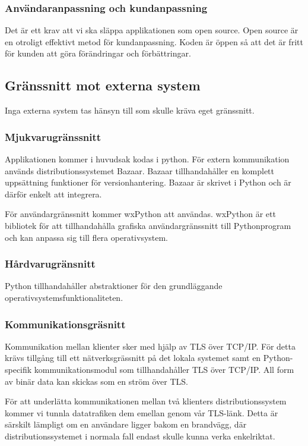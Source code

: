 \subsubsection{Användaranpassning och kundanpassning}
Det är ett krav att vi ska släppa applikationen som open source. Open source är en otroligt effektivt metod för kundanpassning. Koden är öppen så att det är fritt för kunden att göra förändringar och förbättringar. 

\subsection{Gränssnitt mot externa system}
Inga externa system tas hänsyn till som skulle kräva eget gränssnitt. 

\subsubsection{Mjukvarugränssnitt}
Applikationen kommer i huvudsak kodas i python. För extern kommunikation används distributionssystemet Bazaar. Bazaar tillhandahåller en komplett uppsättning funktioner för versionhantering. Bazaar är skrivet i Python och är därför enkelt att integrera.

För användargränssnitt kommer wxPython att användas. wxPython är ett bibliotek för att tillhandahålla grafiska användargränssnitt till Pythonprogram och kan anpassa sig till flera operativsystem.

\subsubsection{Hårdvarugränsnitt}
Python tillhandahåller abstraktioner för den grundläggande operativsystemsfunktionaliteten.

\subsubsection{Kommunikationsgräsnitt}
Kommunikation mellan klienter sker med hjälp av TLS över TCP/IP. För detta krävs tillgång till ett nätverksgrässnitt på det lokala systemet samt en Python-specifik kommunikationsmodul som tillhandahåller TLS över TCP/IP. All form av binär data kan skickas som en ström över TLS.

För att underlätta kommunikationen mellan två klienters distributionssystem kommer vi tunnla datatrafiken dem emellan genom vår TLS-länk. Detta är särskilt lämpligt om en användare ligger bakom en brandvägg, där distributionssystemet i normala fall endast skulle kunna verka enkelriktat.

